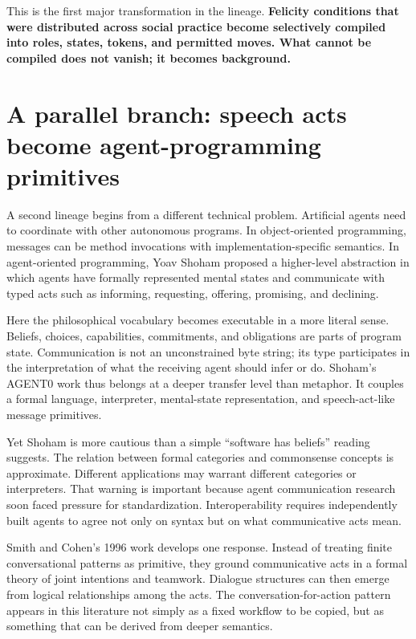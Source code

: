 \documentclass[11pt]{article}
\begin{document}
This is the first major transformation in the lineage. \textbf{Felicity conditions that were distributed across social practice become selectively compiled into roles, states, tokens, and permitted moves. What cannot be compiled does not vanish; it becomes background.}

\section{A parallel branch: speech acts become agent-programming primitives}
A second lineage begins from a different technical problem. Artificial agents need to coordinate with other autonomous programs. In object-oriented programming, messages can be method invocations with implementation-specific semantics. In agent-oriented programming, Yoav Shoham proposed a higher-level abstraction in which agents have formally represented mental states and communicate with typed acts such as informing, requesting, offering, promising, and declining. \cite{shoham1993aop}

Here the philosophical vocabulary becomes executable in a more literal sense. Beliefs, choices, capabilities, commitments, and obligations are parts of program state. Communication is not an unconstrained byte string; its type participates in the interpretation of what the receiving agent should infer or do. Shoham's AGENT0 work thus belongs at a deeper transfer level than metaphor. It couples a formal language, interpreter, mental-state representation, and speech-act-like message primitives. \cite{shoham1993aop}

Yet Shoham is more cautious than a simple ``software has beliefs'' reading suggests. The relation between formal categories and commonsense concepts is approximate. Different applications may warrant different categories or interpreters. That warning is important because agent communication research soon faced pressure for standardization. Interoperability requires independently built agents to agree not only on syntax but on what communicative acts mean.

Smith and Cohen's 1996 work develops one response. Instead of treating finite conversational patterns as primitive, they ground communicative acts in a formal theory of joint intentions and teamwork. Dialogue structures can then emerge from logical relationships among the acts. The conversation-for-action pattern appears in this literature not simply as a fixed workflow to be copied, but as something that can be derived from deeper semantics. \cite{smithcohen1996semantics}
\end{document}
